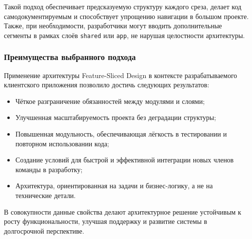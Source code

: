 Такой подход обеспечивает предсказуемую структуру каждого среза, делает код самодокументируемым и способствует упрощению навигации в большом проекте. Также, при необходимости, разработчики могут вводить дополнительные сегменты в рамках слоёв \texttt{shared} или \texttt{app}, не нарушая целостности архитектуры.

\subsubsection{Преимущества выбранного подхода}

Применение архитектуры Feature-Sliced Design в контексте разрабатываемого клиентского приложения позволило достичь следующих результатов:

\begin{itemize}
  \item Чёткое разграничение обязанностей между модулями и слоями;
  \item Улучшенная масштабируемость проекта без деградации структуры;
  \item Повышенная модульность, обеспечивающая лёгкость в тестировании и повторном использовании кода;
  \item Создание условий для быстрой и эффективной интеграции новых членов команды в разработку;
  \item Архитектура, ориентированная на задачи и бизнес-логику, а не на технические детали.
\end{itemize}

В совокупности данные свойства делают архитектурное решение устойчивым к росту функциональности, улучшая поддержку и развитие системы в долгосрочной перспективе.
